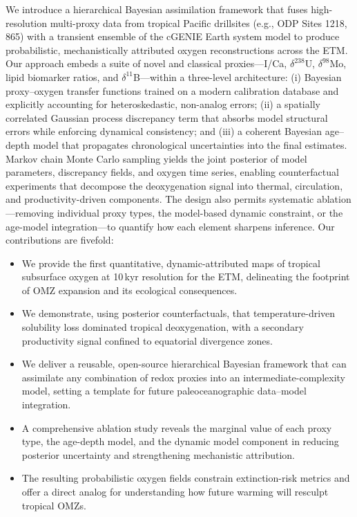 \documentclass{article}
\begin{document}
We introduce a hierarchical Bayesian assimilation framework that fuses high-resolution multi-proxy data from tropical Pacific drillsites (e.g., ODP Sites 1218, 865) with a transient ensemble of the cGENIE Earth system model to produce probabilistic, mechanistically attributed oxygen reconstructions across the ETM. Our approach embeds a suite of novel and classical proxies—I/Ca, $\delta^{238}$U, $\delta^{98}$Mo, lipid biomarker ratios, and $\delta^{11}$B—within a three-level architecture: (i) Bayesian proxy–oxygen transfer functions trained on a modern calibration database and explicitly accounting for heteroskedastic, non-analog errors; (ii) a spatially correlated Gaussian process discrepancy term that absorbs model structural errors while enforcing dynamical consistency; and (iii) a coherent Bayesian age–depth model that propagates chronological uncertainties into the final estimates. Markov chain Monte Carlo sampling yields the joint posterior of model parameters, discrepancy fields, and oxygen time series, enabling counterfactual experiments that decompose the deoxygenation signal into thermal, circulation, and productivity-driven components. The design also permits systematic ablation—removing individual proxy types, the model-based dynamic constraint, or the age-model integration—to quantify how each element sharpens inference.
Our contributions are fivefold:
\begin{itemize}
    \item We provide the first quantitative, dynamic-attributed maps of tropical subsurface oxygen at 10\,kyr resolution for the ETM, delineating the footprint of OMZ expansion and its ecological consequences.
    \item We demonstrate, using posterior counterfactuals, that temperature-driven solubility loss dominated tropical deoxygenation, with a secondary productivity signal confined to equatorial divergence zones.
    \item We deliver a reusable, open-source hierarchical Bayesian framework that can assimilate any combination of redox proxies into an intermediate-complexity model, setting a template for future paleoceanographic data–model integration.
    \item A comprehensive ablation study reveals the marginal value of each proxy type, the age-depth model, and the dynamic model component in reducing posterior uncertainty and strengthening mechanistic attribution.
    \item The resulting probabilistic oxygen fields constrain extinction-risk metrics and offer a direct analog for understanding how future warming will resculpt tropical OMZs.
\end{itemize}
\end{document}
